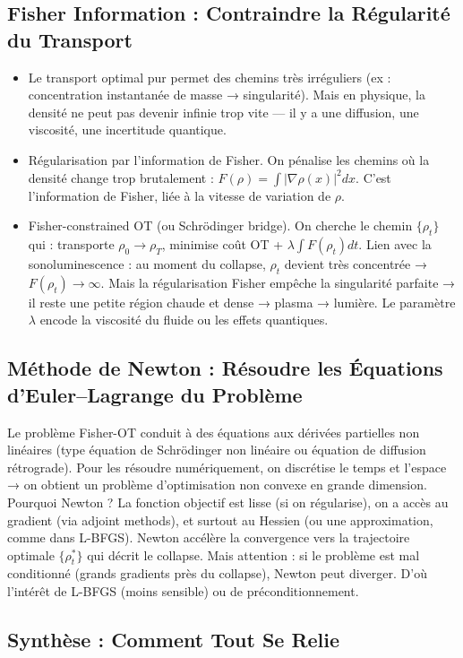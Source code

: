 \documentclass[a4paper,12pt]{article}
\begin{document}
\subsection{Fisher Information : Contraindre la Régularité du Transport}
\begin{itemize}
    \item Le transport optimal pur permet des chemins très irréguliers (ex : concentration instantanée de masse → singularité). Mais en physique, la densité ne peut pas devenir infinie trop vite — il y a une diffusion, une viscosité, une incertitude quantique.
    \item Régularisation par l’information de Fisher. On pénalise les chemins où la densité change trop brutalement : \( F(\rho) = \int \vert \nabla \rho(x) \vert^2 dx \). C’est l’information de Fisher, liée à la vitesse de variation de \( \rho \).
    \item Fisher-constrained OT (ou Schrödinger bridge). On cherche le chemin \( \{ \rho_t \} \) qui : transporte \( \rho_0 \rightarrow \rho_T \), minimise coût OT + \( \lambda \int F(\rho_t) dt \). Lien avec la sonoluminescence : au moment du collapse, \( \rho_t \) devient très concentrée → \( F(\rho_t) \rightarrow \infty \). Mais la régularisation Fisher empêche la singularité parfaite → il reste une petite région chaude et dense → plasma → lumière. Le paramètre \( \lambda \) encode la viscosité du fluide ou les effets quantiques.
\end{itemize}
\subsection{Méthode de Newton : Résoudre les Équations d’Euler–Lagrange du Problème}
Le problème Fisher-OT conduit à des équations aux dérivées partielles non linéaires (type équation de Schrödinger non linéaire ou équation de diffusion rétrograde). Pour les résoudre numériquement, on discrétise le temps et l’espace → on obtient un problème d’optimisation non convexe en grande dimension. Pourquoi Newton ? La fonction objectif est lisse (si on régularise), on a accès au gradient (via adjoint methods), et surtout au Hessien (ou une approximation, comme dans L-BFGS). Newton accélère la convergence vers la trajectoire optimale \( \{ \rho_t^* \} \) qui décrit le collapse. Mais attention : si le problème est mal conditionné (grands gradients près du collapse), Newton peut diverger. D’où l’intérêt de L-BFGS (moins sensible) ou de préconditionnement.
\subsection{Synthèse : Comment Tout Se Relie}
\end{document}
